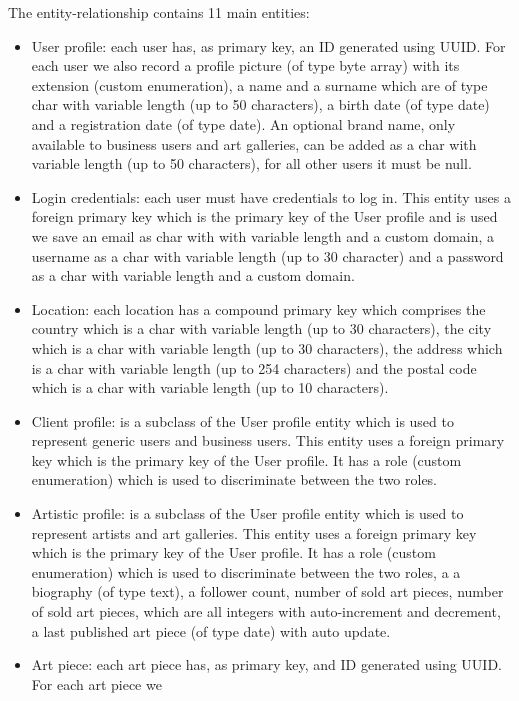 The entity-relationship contains 11 main entities:
\begin{itemize}
    \item User profile: each user has, as primary key, an ID generated using UUID. For each user we also record
    a profile picture (of type byte array) with its extension (custom enumeration), a name and a surname which
    are of type char with variable length (up to 50 characters), a birth date (of type date) and a registration
    date (of type date). An optional brand name, only available to business users and art galleries, can be added
     as a char with variable length (up to 50 characters), for all other users it must be null.
    \item Login credentials: each user must have credentials to log in. This entity uses a foreign primary key 
    which is the primary key of the User profile and is used we save an email as char with with variable length 
    and a custom domain, a username as a char with variable length (up to 30 character) and a password as a char
     with variable length and a custom domain.
    \item Location: each location has a compound primary key which comprises the country which is a char with 
    variable length (up to 30 characters), the city which is a char with variable length (up to 30 characters), the
     address which is a char with variable length (up to 254 characters) and the postal code which is a char with 
     variable length (up to 10 characters).
    \item Client profile: is a subclass of the User profile entity which is used to represent generic users and 
    business users. This entity uses a foreign primary key which is the primary key of the User profile. It has a
     role (custom enumeration) which is used to discriminate between the two roles.
    \item Artistic profile: is a subclass of the User profile entity which is used to represent artists and art 
    galleries. This entity uses a foreign primary key which is the primary key of the User profile. It has a role 
    (custom enumeration) which is used to discriminate between the two roles, a 
    a biography (of type text), a follower count, number of sold art pieces, number of sold art pieces, which are
    all integers with auto-increment and decrement, a last published art piece (of type date) with auto update.
    \item Art piece: each art piece has, as primary key, and ID generated using UUID. For each art piece we 

\end{itemize}
